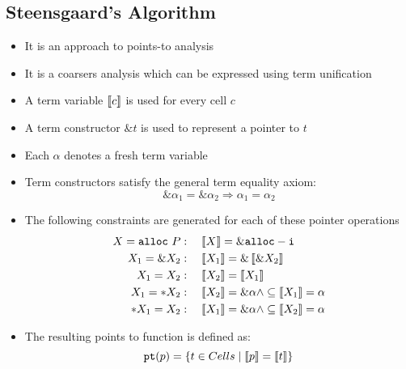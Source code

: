\subsection{Steensgaard's Algorithm}
\begin{itemize}
  \item It is an approach to points-to analysis
  \item It is a coarsers analysis which can be expressed using term unification
  \item A term variable $\left\llbracket c\right\rrbracket$ is used for every cell $c$
  \item A term constructor $\& t$ is used to represent a pointer to $t$
  \item Each $\alpha$ denotes a fresh term variable
  \item Term constructors satisfy the general term equality axiom:
  \begin{equation*}
    \& \alpha_1 = \& \alpha_2 \Rightarrow \alpha_1 = \alpha_2
  \end{equation*}
  \item The following constraints are generated for each of these pointer operations
  \begin{align*} 
    X = \mathtt{alloc} \ P &: \quad  \left\llbracket X\right\rrbracket = \& \mathtt{alloc-i}\\
    X_1 = \&X_2 &: \quad \left\llbracket X_1\right\rrbracket = \& \left\llbracket\& X_2\right\rrbracket \\
    X_1 = X_2 &: \quad \left\llbracket X_2\right\rrbracket = \left\llbracket X_1\right\rrbracket \\
    X_1 = *X_2 &: \quad \left\llbracket X_2\right\rrbracket = \&\alpha \land \subseteq \left\llbracket X_1\right\rrbracket = \alpha \\
    *X_1 = X_2 &: \quad \left\llbracket X_1\right\rrbracket = \&\alpha \land \subseteq \left\llbracket X_2\right\rrbracket = \alpha
  \end{align*}
  \item The resulting points to function is defined as:
  \begin{equation*}
    \mathtt{pt}(p) = \left\{t \in Cells \mid \left\llbracket p\right\rrbracket = \left\llbracket t\right\rrbracket\right\}
  \end{equation*}	
\end{itemize}

